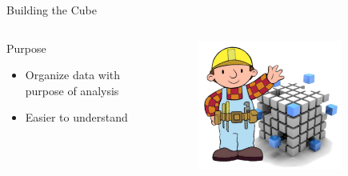 
\begin{frame}{Building the Cube}
\begin{columns}
\begin{block}{Purpose}
\begin{itemize}
    \item Organize data with purpose of analysis
    \item Easier to understand
\end{itemize}
\end{block}
\begin{figure}
        \includegraphics[width=0.8\textwidth]{images/cubeBuilder.png}
    \end{figure}
\end{columns}


\end{frame}


